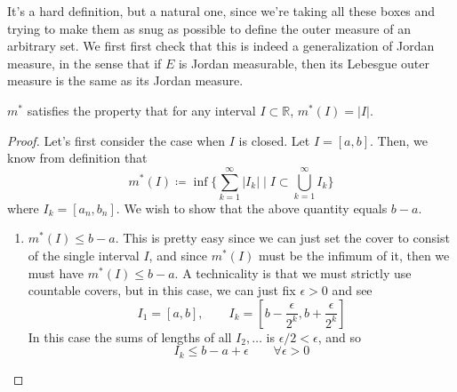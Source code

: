   It's a hard definition, but a natural one, since we're taking all these boxes and trying to make them as snug as possible to define the outer measure of an arbitrary set. We first first check that this is indeed a generalization of Jordan measure, in the sense that if $E$ is Jordan measurable, then its Lebesgue outer measure is the same as its Jordan measure. 

  \begin{theorem}
    $m^\ast$ satisfies the property that for any interval $I \subset \mathbb{R}$, $m^\ast (I) = |I|$. 
  \end{theorem}
  \begin{proof}
    Let's first consider the case when $I$ is closed. Let $I = [a, b]$. Then, we know from definition that 
    \begin{equation}
      m^\ast (I) \coloneqq \inf \bigg\{ \sum_{k=1}^\infty |I_k| \;\bigg|\; I \subset \bigcup_{k=1}^\infty I_k\bigg\}
    \end{equation}
    where $I_k = [a_n, b_n]$. We wish to show that the above quantity equals $b - a$. 
    \begin{enumerate}
      \item $m^\ast (I) \leq b - a$. This is pretty easy since we can just set the cover to consist of the single interval $I$, and since $m^\ast (I)$ must be the infimum of it, then we must have $m^\ast(I) \leq b - a$. A technicality is that we must strictly use countable covers, but in this case, we can just fix $\epsilon > 0$ and see 
      \begin{equation}
        I_1 = [a, b], \qquad I_k = [b - \frac{\epsilon}{2^k}, b + \frac{\epsilon}{2^k}]
      \end{equation}
      In this case the sums of lengths of all $I_2, \ldots$ is $\epsilon/2 < \epsilon$, and so 
      \begin{equation}
        I_k \leq b - a + \epsilon \qquad \forall \epsilon > 0 
      \end{equation}


\end{enumerate}
\end{proof}
